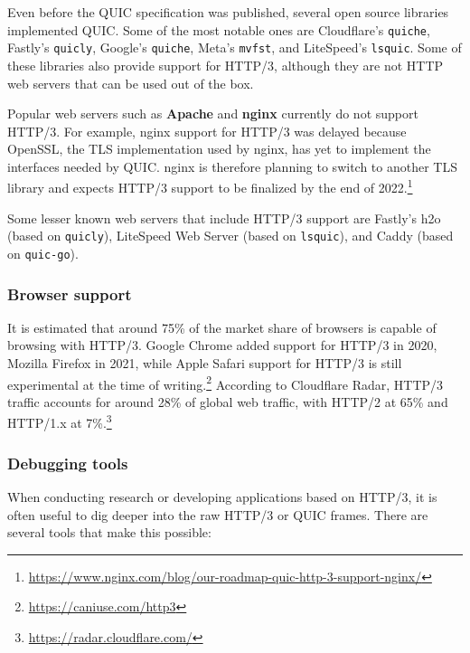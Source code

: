 Even before the QUIC specification was published, several open source libraries implemented QUIC. Some of the most notable ones are Cloudflare's \texttt{quiche}, Fastly's \texttt{quicly}, Google's \texttt{quiche}, Meta's \texttt{mvfst}, and LiteSpeed's \texttt{lsquic}.\cite{quicdiversity} Some of these libraries also provide support for HTTP/3, although they are not HTTP web servers that can be used out of the box.

Popular web servers such as \textbf{Apache} and \textbf{nginx} currently do not support HTTP/3. For example, nginx support for HTTP/3 was delayed because OpenSSL, the TLS implementation used by nginx, has yet to implement the interfaces needed by QUIC. nginx is therefore planning to switch to another TLS library and expects HTTP/3 support to be finalized by the end of 2022.\footnote{\url{https://www.nginx.com/blog/our-roadmap-quic-http-3-support-nginx/}}

Some lesser known web servers that include HTTP/3 support are Fastly's h2o (based on \texttt{quicly}), LiteSpeed Web Server (based on \texttt{lsquic}), and Caddy (based on \texttt{quic-go}).

\subsubsection{Browser support}
\label{sec:bg/http3/browsers}

It is estimated that around 75\% of the market share of browsers is capable of browsing with HTTP/3. Google Chrome added support for HTTP/3 in 2020, Mozilla Firefox in 2021, while Apple Safari support for HTTP/3 is still experimental at the time of writing.\footnote{\url{https://caniuse.com/http3}} According to Cloudflare Radar, HTTP/3 traffic accounts for around 28\% of global web traffic, with HTTP/2 at 65\% and HTTP/1.x at 7\%.\footnote{\url{https://radar.cloudflare.com/}}

\subsubsection{Debugging tools}
\label{sec:bg/http3/tools}

When conducting research or developing applications based on HTTP/3, it is often useful to dig deeper into the raw HTTP/3 or QUIC frames. There are several tools that make this possible:

